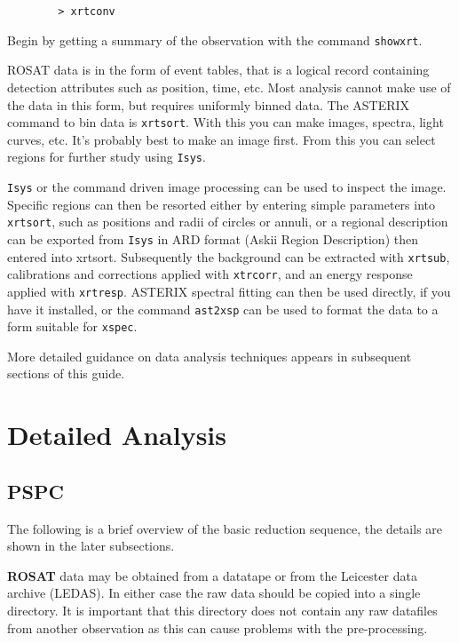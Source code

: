 \documentclass[11pt,fleqn]{article}    %
\begin{document}
\begin{verbatim}
        > xrtconv
\end{verbatim}

Begin by getting a summary of the observation with the command {\tt showxrt}.

ROSAT data is in the form of event tables, that is a logical record
containing detection attributes such as position, time, etc. Most
analysis cannot make use of the data in this form, but requires uniformly
binned data. The ASTERIX command to bin data is {\tt xrtsort}. With this
you can make images, spectra, light curves, etc. It's probably
best to make an image first. From this you  can select regions for
further study using {\tt Isys}.

{\tt Isys} or the  command driven image  processing can be used to  inspect
the image.  Specific regions can then be resorted either by entering simple
parameters  into {\tt xrtsort}, such  as positions and  radii of circles or
annuli, or a  regional description can be exported  from {\tt Isys}  in ARD
format (Askii Region Description) then  entered into xrtsort.  Subsequently
the  background   can be  extracted  with  {\tt  xrtsub},  calibrations and
corrections applied with {\tt xtrcorr}, and an energy response applied with
{\tt xrtresp}.  ASTERIX spectral fitting can then  be used directly, if you
have it installed, or the  command {\tt ast2xsp}  can be used to format the
data to a form suitable for {\tt xspec}.

More detailed guidance on data analysis techniques appears in subsequent
sections of this guide.

\newpage
\section{Detailed Analysis}

\subsection{PSPC}

The following is a brief overview of the basic reduction sequence, the
details are shown in the later subsections.

{\bf ROSAT} data may be obtained from a datatape or from the Leicester
data archive (LEDAS).  In either case the raw data should be copied
into a single directory.  It is important that this directory does not
contain any raw datafiles from another observation as this can cause
problems with the pre-processing.
\end{document}
